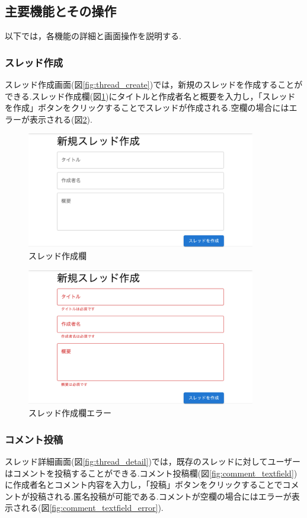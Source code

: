 \documentclass[b5paper,12pt,dvipdfmx]{jsreport}
\begin{document}
\subsection{主要機能とその操作}

以下では，各機能の詳細と画面操作を説明する.


\subsubsection{スレッド作成}
スレッド作成画面(図\ref{fig:thread_create})では，新規のスレッドを作成することができる.スレッド作成欄(図\ref{fig:thread_textfield})にタイトルと作成者名と概要を入力し，「スレッドを作成」ボタンをクリックすることでスレッドが作成される.空欄の場合にはエラーが表示される(図\ref{fig:thread_textfield_error}).

\begin{figure}[H]
	\centering
    \includegraphics[width=100mm,height=50.81mm]{./img/feature/thread_textfield.png}
	\caption{スレッド作成欄}
	\label{fig:thread_textfield}
\end{figure}

\begin{figure}[H]
	\centering
    \includegraphics[width=100mm,height=60.05mm]{./img/feature/thread_textfield_error.png}
	\caption{スレッド作成欄エラー}
	\label{fig:thread_textfield_error}
\end{figure}

\subsubsection{コメント投稿}
スレッド詳細画面(図\ref{fig:thread_detail})では，既存のスレッドに対してユーザーはコメントを投稿することができる.コメント投稿欄(図\ref{fig:comment_textfield})に作成者名とコメント内容を入力し，「投稿」ボタンをクリックすることでコメントが投稿される.匿名投稿が可能である.コメントが空欄の場合にはエラーが表示される(図\ref{fig:comment_textfield_error}).
\end{document}
